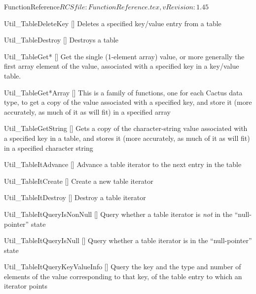 \begin{cactuspart}{5}{FunctionReference}{$RCSfile: FunctionReference.tex,v $}{$Revision: 1.45 $}
\begin{Lentry}
\item[Util\_TableDeleteKey]
     [\pageref{Util-TableDeleteKey}]
Deletes a specified key/value entry from a table

\item[Util\_TableDestroy]
     [\pageref{Util-TableDestroy}]
Destroys a table

\item[Util\_TableGet*]
     [\pageref{Util-TableGet*}]
Get the single (1-element array) value, or more generally the first
array element of the value, associated with a specified key in a
key/value table.

\item[Util\_TableGet*Array]
     [\pageref{Util-TableGet*Array}]
This is a family of functions, one for each Cactus data type, to get
a copy of the value associated with a specified key, and store it
(more accurately, as much of it as will fit) in a specified array

\item[Util\_TableGetString]
     [\pageref{Util-TableGetString}]
Gets a copy of the character-string value associated with a specified
key in a table, and stores it (more accurately, as much of it as will fit)
in a specified character string

\item[Util\_TableItAdvance]
     [\pageref{Util-TableItAdvance}]
Advance a table iterator to the next entry in the table

\item[Util\_TableItCreate]
     [\pageref{Util-TableItCreate}]
Create a new table iterator

\item[Util\_TableItDestroy]
     [\pageref{Util-TableItDestroy}]
Destroy a table iterator

\item[Util\_TableItQueryIsNonNull]
     [\pageref{Util-TableItQueryIsNonNull}]
Query whether a table iterator is {\em not\/} in the ``null-pointer'' state

\item[Util\_TableItQueryIsNull]
     [\pageref{Util-TableItQueryIsNull}]
Query whether a table iterator is in the ``null-pointer'' state

\item[Util\_TableItQueryKeyValueInfo]
     [\pageref{Util-TableItQueryKeyValueInfo}]
Query the key and the type and number of elements of the value
corresponding to that key, of the table entry to which an iterator points


\end{Lentry}
\end{cactuspart}
